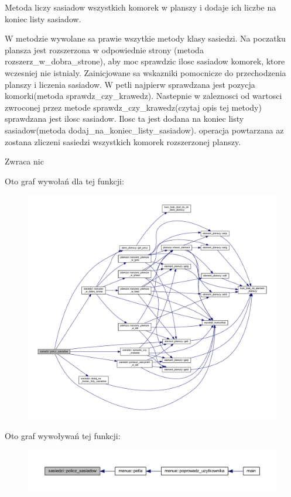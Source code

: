 Metoda liczy sasiadow wszystkich komorek w planszy i dodaje ich liczbe na koniec listy sasiadow.

W metodzie wywolane sa prawie wszytkie metody klasy sasiedzi. Na poczatku plansza jest rozszerzona w odpowiednie strony (metoda rozszerz\+\_\+w\+\_\+dobra\+\_\+strone), aby moc sprawdzic ilosc sasiadow komorek, ktore wczesniej nie istnialy. Zainicjowane sa wskazniki pomocnicze do przechodzenia planszy i liczenia sasiadow. W petli najpierw sprawdzana jest pozycja komorki(metoda sprawdz\+\_\+czy\+\_\+krawedz). Nastepnie w zaleznosci od wartosci zwroconej przez metode sprawdz\+\_\+czy\+\_\+krawedz(czytaj opis tej metody) sprawdzana jest ilosc sasiadow. Ilosc ta jest dodana na koniec listy sasiadow(metoda dodaj\+\_\+na\+\_\+koniec\+\_\+listy\+\_\+sasiadow). operacja powtarzana az zostana zliczeni sasiedzi wszystkich komorek rozszerzonej planszy. \begin{DoxyReturn}{Zwraca}
nic 
\end{DoxyReturn}
Oto graf wywołań dla tej funkcji\+:
\nopagebreak
\begin{figure}[H]
\begin{center}
\leavevmode
\includegraphics[width=350pt]{classsasiedzi_afe22b3109116d244e1601923e52e7ddf_cgraph}
\end{center}
\end{figure}
Oto graf wywoływań tej funkcji\+:
\nopagebreak
\begin{figure}[H]
\begin{center}
\leavevmode
\includegraphics[width=350pt]{classsasiedzi_afe22b3109116d244e1601923e52e7ddf_icgraph}
\end{center}
\end{figure}
\mbox{\label{classsasiedzi_a5f50acc6fb740edf64619f2d3976dcb9}} 
